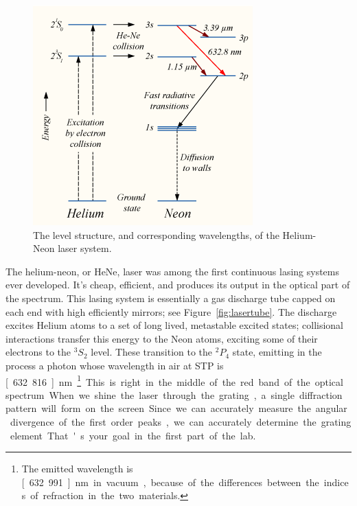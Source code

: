 \documentclass[12pt]{article}
\begin{document}
\begin{figure}
  \centering
  \includegraphics[width=2\textwidth/3]{figures/Hene-2}
  \caption{The level structure, and corresponding wavelengths, of the
    Helium-Neon laser system.}
  \label{fig:levels}
\end{figure}

The helium-neon, or HeNe, laser was among the first continuous lasing
systems ever developed.  It's cheap, efficient, and produces its
output in the optical part of the spectrum.  This lasing system is
essentially a gas discharge tube capped on each end with high
efficiently mirrors; see Figure~\ref{fig:lasertube}.  The discharge
excites Helium atoms to a set of long lived, metastable excited
states; collisional interactions transfer this energy to the Neon
atoms, exciting some of their electrons to the $^3S_2$ level.  These
transition to the $^2P_4$ state, emitting in the process a photon
whose wavelength in air at STP is \unit[632.816]{nm}.\footnote{The
  emitted wavelength is \unit[632.991]{nm} in vacuum, because of the
  differences between the indices of refraction in the two materials.}
This is right in the middle of the red band of the optical spectrum.

When we shine the laser through the grating, a single diffraction
pattern will form on the screen.  Since we can accurately measure the
angular divergence of the first order peaks, we can accurately
determine the grating element.  That's your goal in the first part of
the lab.
\end{document}
